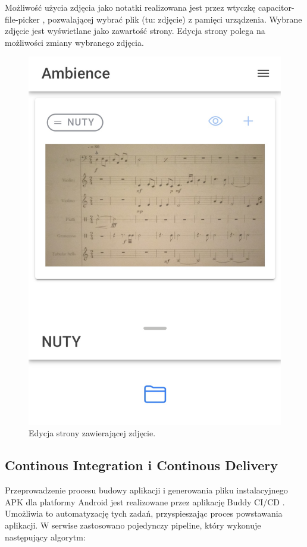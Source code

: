 Możliwość użycia zdjęcia jako notatki realizowana jest przez wtyczkę capacitor-file-picker \cite{plugins},
pozwalającej wybrać plik (tu: zdjęcie) z pamięci urządzenia. Wybrane zdjęcie jest wyświetlane jako zawartość strony.
Edycja strony polega na możliwości zmiany wybranego zdjęcia.

\begin{figure}[H]
	\begin{center}
		\includegraphics[scale=0.11]{media/PhotoEditor.jpg}
	\end{center}
	\caption{Edycja strony zawierającej zdjęcie.}
	\label{rys:photo-editor}
\end{figure}
\subsection{Continous Integration i Continous Delivery}
Przeprowadzenie procesu budowy aplikacji i generowania pliku instalacyjnego APK dla platformy Android jest realizowane przez aplikację
Buddy CI/CD \cite{buddy}. Umożliwia to automatyzację tych zadań, przyspieszając proces powstawania aplikacji.
W serwise zastosowano pojedynczy pipeline, który wykonuje następujący algorytm:

